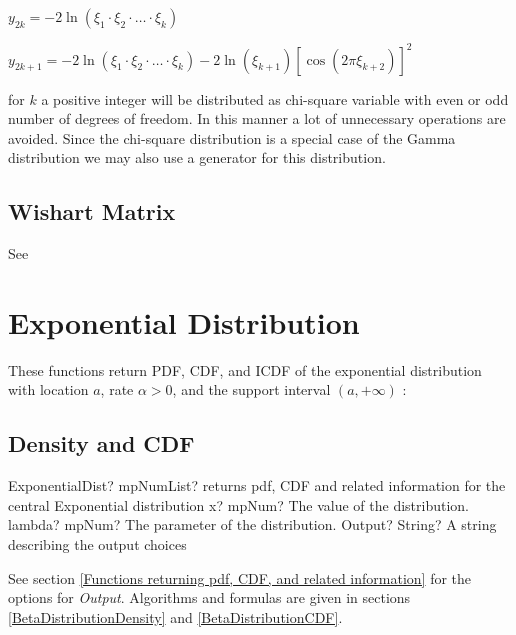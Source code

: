 \begin{center}
	
	$y_{2k} = -2 \ln(\xi_1 \cdot \xi_2 \cdot \ldots \cdot \xi_k)$
	
	$y_{2k+1} = -2\ln(\xi_1 \cdot \xi_2 \cdot \ldots \cdot \xi_k) - 2\ln(\xi_{k+1}) [\cos(2\pi\xi_{k+2})]^2$
	
	
\end{center}
for $k$ a positive integer will be distributed as chi-square variable with even or odd number
of degrees of freedom. In this manner a lot of unnecessary operations are avoided.
Since the chi-square distribution is a special case of the Gamma distribution we may
also use a generator for this distribution.



\subsection{Wishart Matrix}

See \cite{gleser1976}




\section{Exponential Distribution}
\label{ExponentialDistribution}


These functions return PDF, CDF, and ICDF of the exponential distribution with
location $a$, rate $\alpha > 0$, and the support interval $(a,+\infty)$ :




\subsection{Density and CDF}

\begin{mpFunctionsExtract}
	\mpFunctionThree
	{ExponentialDist? mpNumList? returns pdf, CDF and related information for the central Exponential distribution}
	{x? mpNum? The value of the distribution.}
	{lambda? mpNum? The parameter of the distribution.}
	{Output? String? A string describing the output choices}
\end{mpFunctionsExtract}


\vspace{0.3cm}
See section \ref{Functions returning pdf, CDF, and related information} for the options for {\itshape\sffamily Output}. Algorithms and formulas are given in sections \ref{BetaDistributionDensity} and \ref{BetaDistributionCDF}.



